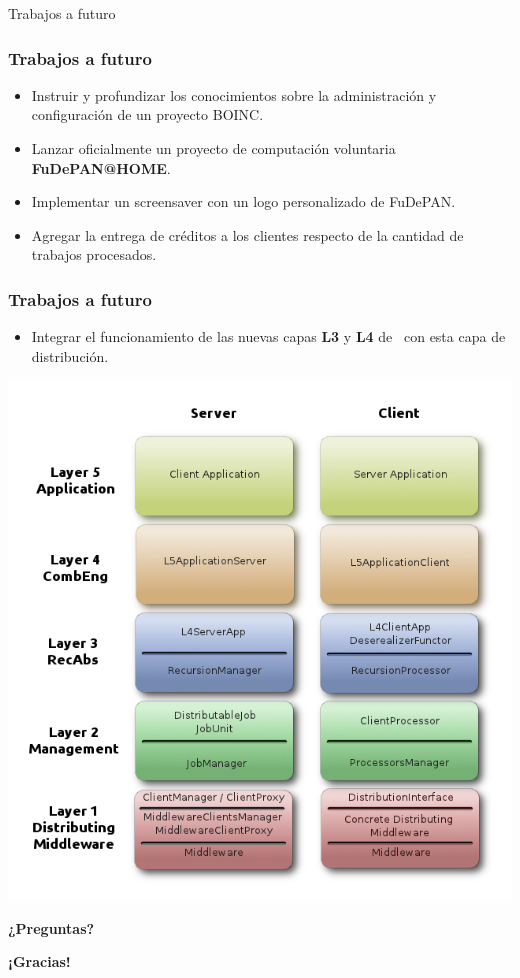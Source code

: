 \begin{subsection}{Trabajos a futuro}

	\begin{frame}\frametitle{Trabajos a futuro}
		\begin{itemize}\addtolength{\itemsep}{5mm}
			\item Instruir y profundizar los conocimientos sobre la administración y configuración de un proyecto BOINC.
			\item Lanzar oficialmente un proyecto de computación voluntaria \textbf{FuDePAN@HOME}.
			\item Implementar un screensaver con un logo personalizado de FuDePAN.
			\item Agregar la entrega de créditos a los clientes respecto de la cantidad de trabajos procesados.			
		\end{itemize}
	\end{frame}
		
	\begin{frame}\frametitle{Trabajos a futuro}
		\begin{itemize}
			\item Integrar el funcionamiento de las nuevas capas \textbf{L3} y \textbf{L4} de \fud \ con esta capa de distribución.
		\end{itemize}	
		\begin{center}
			\includegraphics[scale=0.26]{images/fud-l4.png}
		\end{center}
	\end{frame}
	
	\begin{frame}
		\centerline{\Huge{\textbf{¿Preguntas?}}}
	\end{frame}
	
	\begin{frame}
		\centerline{\Huge{\textbf{¡Gracias!}}}
	\end{frame}

\end{subsection}

